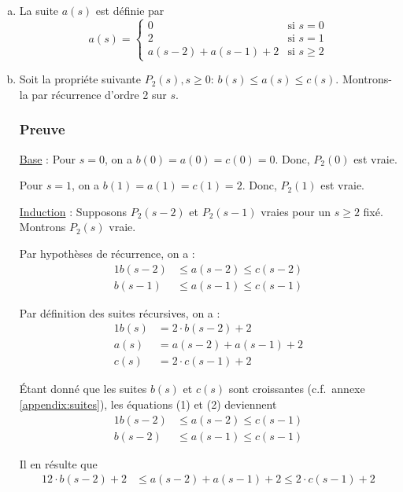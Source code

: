 \documentclass[12pt,a4paper]{article}
\begin{document}
\begin{enumerate}[a)]
\item La suite $a(s)$ est d\'efinie par
\[ a(s) = \begin{cases} 
      0 & \text{si } s = 0 \\
      2 & \text{si } s = 1 \\
      a(s-2) + a(s-1) + 2 & \text{si } s\geq 2 
   \end{cases}
\]

\item Soit la propri\'ete suivante $P_{2}(s), s\geq 0$: $ b(s) \leq a(s) \leq c(s) $.
Montrons-la par r\'ecurrence d'ordre 2 sur $s$. 

\subsubsection*{Preuve}
\underline{Base} : Pour \( s = 0\), on a $b(0) = a(0) = c(0) = 0 $. Donc, $P_{2}(0)$ est vraie.

Pour \( s = 1\), on a $b(1) = a(1) = c(1) = 2 $. Donc, $P_{2}(1)$ est vraie.

\medskip
\underline{Induction} : Supposons \( P_{2}(s-2) \) et \( P_{2}(s-1) \) vraies pour un \( s \geq 2 \) fix\'e. Montrons \( P_{2}(s) \) vraie.

Par hypoth\`eses de r\'ecurrence, on a : 
\begin{alignat}{1}
b(s-2) &\leq a(s-2) \leq c(s-2) \\
b(s-1) &\leq a(s-1) \leq c(s-1)
\end{alignat} 

Par d\'efinition des suites r\'ecursives, on a :
\begin{alignat}{1}
b(s) &= 2\cdot b(s-2) + 2 \\
a(s) &= a(s-2) + a(s-1) + 2 \\
c(s) &= 2\cdot c(s-1) + 2
\end{alignat}

\'Etant donn\'e que les suites $b(s)$ et $c(s)$ sont croissantes (c.f.\ annexe \ref{appendix:suites}), les \'equations (1) et (2) deviennent
\begin{alignat*}{1}
b(s-2) &\leq a(s-2) \leq c(s-1) \\
b(s-2) &\leq a(s-1) \leq c(s-1)
\end{alignat*}

Il en r\'esulte que 
\begin{alignat}{1}
2\cdot b(s-2) + 2 &\leq a(s-2) + a(s-1) + 2 \leq 2\cdot c(s-1) + 2
\end{alignat}


\end{enumerate}
\end{document}
